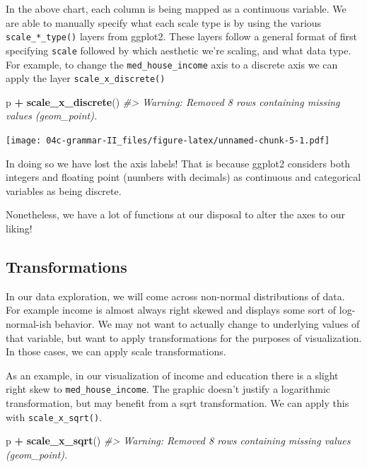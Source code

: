\documentclass[
]{book}
\newenvironment{Shaded}{\begin{snugshade}}{\end{snugshade}}
\newcommand{\CommentTok}[1]{\textcolor[rgb]{0.56,0.35,0.01}{\textit{#1}}}
\newcommand{\KeywordTok}[1]{\textcolor[rgb]{0.13,0.29,0.53}{\textbf{#1}}}
\newcommand{\NormalTok}[1]{#1}
\newcommand{\OperatorTok}[1]{\textcolor[rgb]{0.81,0.36,0.00}{\textbf{#1}}}
\newcommand{\StringTok}[1]{\textcolor[rgb]{0.31,0.60,0.02}{#1}}
\begin{document}
In the above chart, each column is being mapped as a continuous variable. We are able to manually specify what each scale type is by using the various \texttt{scale\_*\_type()} layers from ggplot2. These layers follow a general format of first specifying \texttt{scale} followed by which aesthetic we're scaling, and what data type. For example, to change the \texttt{med\_house\_income} axis to a discrete axis we can apply the layer \texttt{scale\_x\_discrete()}

\begin{Shaded}
\begin{Highlighting}[]
\NormalTok{p }\OperatorTok{+}
\StringTok{  }\KeywordTok{scale\_x\_discrete}\NormalTok{() }
\CommentTok{\#\textgreater{} Warning: Removed 8 rows containing missing values (geom\_point).}
\end{Highlighting}
\end{Shaded}

\texttt{[image: 04c-grammar-II\_files/figure-latex/unnamed-chunk-5-1.pdf]}

In doing so we have lost the axis labels! That is because ggplot2 considers both integers and floating point (numbers with decimals) as continuous and categorical variables as being discrete.

Nonetheless, we have a lot of functions at our disposal to alter the axes to our liking!

\hypertarget{transformations}{%
\subsection{Transformations}\label{transformations}}

In our data exploration, we will come across non-normal distributions of data. For example income is almost always right skewed and displays some sort of log-normal-ish behavior. We may not want to actually change to underlying values of that variable, but want to apply transformations for the purposes of visualization. In those cases, we can apply scale transformations.

As an example, in our visualization of income and education there is a slight right skew to \texttt{med\_house\_income}. The graphic doesn't justify a logarithmic transformation, but may benefit from a sqrt transformation. We can apply this with \texttt{scale\_x\_sqrt()}.

\begin{Shaded}
\begin{Highlighting}[]
\NormalTok{p }\OperatorTok{+}
\StringTok{  }\KeywordTok{scale\_x\_sqrt}\NormalTok{() }
\CommentTok{\#\textgreater{} Warning: Removed 8 rows containing missing values (geom\_point).}
\end{Highlighting}
\end{Shaded}
\end{document}
